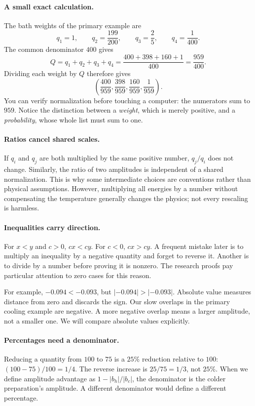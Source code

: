 \paragraph{A small exact calculation.}
The bath weights of the primary example are
\[
q_1=1,\qquad q_2=\frac{199}{200},\qquad
q_3=\frac25,\qquad q_4=\frac1{400}.
\]
The common denominator $400$ gives
\[
Q=q_1+q_2+q_3+q_4
=\frac{400+398+160+1}{400}=\frac{959}{400}.
\]
Dividing each weight by $Q$ therefore gives
\[
\left(\frac{400}{959},\frac{398}{959},
\frac{160}{959},\frac1{959}\right).
\]
You can verify normalization before touching a computer: the numerators sum to
$959$. Notice the distinction between a \emph{weight}, which is merely positive,
and a \emph{probability}, whose whole list must sum to one.

\paragraph{Ratios cancel shared scales.}
If $q_i$ and $q_j$ are both multiplied by the same positive number, $q_j/q_i$
does not change. Similarly, the ratio of two amplitudes is independent of a
shared normalization. This is why some intermediate choices are conventions
rather than physical assumptions. However, multiplying all energies by a
number without compensating the temperature generally changes the physics;
not every rescaling is harmless.

\paragraph{Inequalities carry direction.}
For $x<y$ and $c>0$, $cx<cy$. For $c<0$, $cx>cy$. A frequent mistake later is
to multiply an inequality by a negative quantity and forget to reverse it.
Another is to divide by a number before proving it is nonzero. The research
proofs pay particular attention to zero cases for this reason.

For example, $-0.094<-0.093$, but $|-0.094|>|-0.093|$. Absolute value measures
distance from zero and discards the sign. Our slow overlaps in the primary
cooling example are negative. A more negative overlap means a larger amplitude,
not a smaller one. We will compare absolute values explicitly.

\paragraph{Percentages need a denominator.}
Reducing a quantity from $100$ to $75$ is a $25\%$ reduction relative to $100$:
$(100-75)/100=1/4$. The reverse increase is $25/75=1/3$, not $25\%$. When we
define amplitude advantage as $1-|b_h|/|b_c|$, the denominator is the colder
preparation's amplitude. A different denominator would define a different
percentage.

